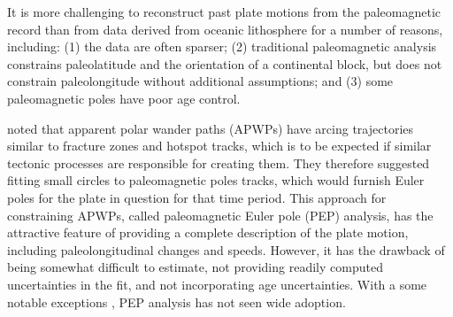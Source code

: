 \documentclass[11pt,letterpaper]{article}
\begin{document}

It is more challenging to reconstruct past plate motions from the paleomagnetic record than from data derived from oceanic lithosphere for a number of reasons, including: (1) the data are often sparser; (2) traditional paleomagnetic analysis constrains paleolatitude and the orientation of a continental block, but does not constrain paleolongitude without additional assumptions; and (3) some paleomagnetic poles have poor age control.

\citet{Gordon1984a} noted that apparent polar wander paths (APWPs) have arcing trajectories similar to fracture zones and hotspot tracks, which is to be expected if similar tectonic processes are responsible for creating them. They therefore suggested fitting small circles to paleomagnetic poles tracks, which would furnish Euler poles for the plate in question for that time period. This approach for constraining APWPs, called paleomagnetic Euler pole (PEP) analysis, has the attractive feature of providing a complete description of the plate motion, including paleolongitudinal changes and speeds.  However, it has the drawback of being somewhat difficult to estimate, not providing readily computed uncertainties in the fit, and not incorporating age uncertainties. With a some notable exceptions \citep[e.g.][]{Bryan1986a, Beck1989a, Tarling1996a,  Beck2003a, Smirnov2010a}, PEP analysis has not seen wide adoption.
\end{document}
